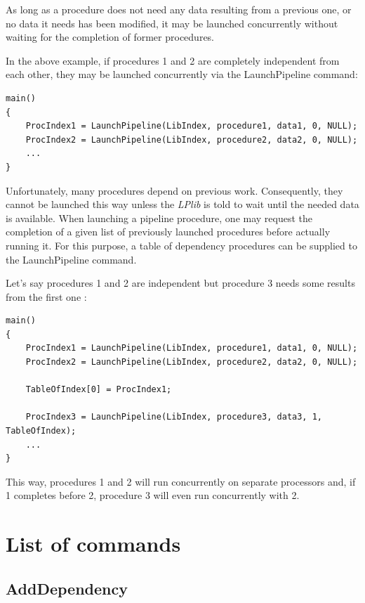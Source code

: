 \documentclass[a4paper,12pt]{article}
\begin{document}
As long as a procedure does not need any data resulting from a previous one, or no data it needs has been modified, it may be launched concurrently without waiting for the completion of former procedures.

In the above example, if procedures 1 and 2 are completely independent from each other, they may be launched concurrently via the LaunchPipeline command:

\begin{tt}
\begin{verbatim}
main()
{
    ProcIndex1 = LaunchPipeline(LibIndex, procedure1, data1, 0, NULL);
    ProcIndex2 = LaunchPipeline(LibIndex, procedure2, data2, 0, NULL);
    ...
}
\end{verbatim}
\end{tt}
\normalfont

Unfortunately, many procedures depend on previous work. Consequently, they cannot be launched this way unless the \emph{LPlib} is told to wait until the needed data is available. When launching a pipeline procedure, one may request the completion of a given list of previously launched procedures before actually running it. For this purpose, a table of dependency procedures can be supplied to the LaunchPipeline command.

Let's say procedures 1 and 2 are independent but procedure 3 needs some results from the first one :

\begin{tt}
\begin{verbatim}
main()
{
    ProcIndex1 = LaunchPipeline(LibIndex, procedure1, data1, 0, NULL);
    ProcIndex2 = LaunchPipeline(LibIndex, procedure2, data2, 0, NULL);

    TableOfIndex[0] = ProcIndex1;

    ProcIndex3 = LaunchPipeline(LibIndex, procedure3, data3, 1, TableOfIndex);
    ...
}
\end{verbatim}
\end{tt}
\normalfont

This way, procedures 1 and 2 will run concurrently on separate processors and, if 1 completes before 2, procedure 3 will even run concurrently with 2.


%
%


\section{List of commands}

\subsection{AddDependency}
\end{document}
